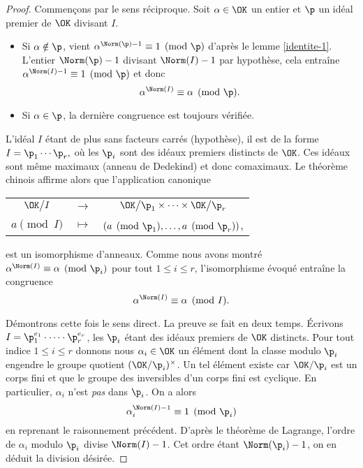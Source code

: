 \begin{proof}
	Commençons par le sens réciproque. Soit $\alpha\in \OK$ un entier et $\p$ un idéal premier de $\OK$ divisant $I$.
	\begin{itemize}
		\item Si $\alpha \notin \p$, vient $\alpha^{\Norm(\p) - 1} \equiv 1 \pmod{\p}$ d'après le lemme \ref{identite-1}. L'entier $\Norm(\p) - 1$ divisant $\Norm(I) - 1$ par hypothèse, cela entraîne $\alpha^{\Norm(I)-1}\equiv 1 \pmod{\p}$ et donc \[\alpha^{\Norm(I)} \equiv \alpha \pmod{\p}.\]
		\item Si $\alpha\in \p$, la dernière congruence est toujours vérifiée.
	\end{itemize}
	L'idéal $I$ étant de plus sans facteurs carrés (hypothèse), il est de la forme $I = \p_1 \cdots \p_r,$ où les $\p_i$ sont des idéaux premiers distincts de $\OK$. Ces idéaux sont même maximaux (anneau de Dedekind) et donc comaximaux. Le théorème chinois affirme alors que l'application canonique
\begin{center}
	\begin{tabular}{ccc}
		$\OK \big/I$ & $\longrightarrow$ & $\OK\big/\p_1\times \dots \times \OK\big/ \p_r$ \\
		$a\pmod{I} $	& $\longmapsto$ & $\left(a\pmod{\p_1} , \dots, a\pmod{\p_r}\right)$,
	\end{tabular}
\end{center}
est un isomorphisme d'anneaux. Comme nous avons montré $\alpha^{\Norm(I)} \equiv \alpha \pmod{\p_i}$ pour tout $1\leq i \leq r$, l'isomorphisme évoqué entraîne la congruence \[\alpha^{\Norm(I)} \equiv \alpha \pmod{I}.\]

	Démontrons cette fois le sens direct. La preuve se fait en deux temps. Écrivons $I = \p_1^{e_1} \cdot \dots \cdot \p_r^{e_r}$, les $\p_i$ étant des idéaux premiers de $\OK$ distincts. Pour tout indice $1\leqslant i \leqslant r$ donnons nous $\alpha_i\in \OK$ un élément dont la classe modulo $\p_i$ engendre le groupe quotient $(\OK/\p_i)^\times$. Un tel élément existe car $\OK/\p_i$ est un corps fini et que le groupe des inversibles d'un corps fini est cyclique. En particulier, $\alpha_i$ n'est \emph{pas} dans $\p_i$. On a alors \[\alpha_i^{\Norm(I) - 1} \equiv 1 \pmod{\p_i}\] en reprenant le raisonnement précédent. D'après le théorème de Lagrange, l'ordre de $\alpha_i$ modulo $\p_i$ divise $\Norm(I) - 1$. Cet ordre étant $\Norm(\p_i) - 1$, on en déduit la division désirée. 


\end{proof}
